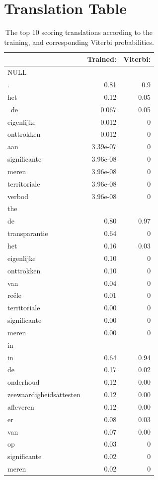 \documentclass[11pt]{article}
\begin{document}
\appendix
\section{Translation Table}
\begin{table}[h]
\begin{tabular}{l r r}

		&Trained:	&Viterbi:\\\hline\hline
NULL &&\\\hline
.		&0.81		&0.9\\
het		&0.12		&0.05\\\
de		&0.067	&0.05\\
eigenlijke	&0.012	&0\\
onttrokken	&0.012	&0\\
aan		&3.39e-07	&0\\
significante	&3.96e-08	&0\\
meren		&3.96e-08	&0\\
territoriale	&3.96e-08	&0\\
verbod	&3.96e-08	&0\\\hline\hline
%
the&&\\\hline		
de		&0.80		&0.97\\
transparantie &0.64	&0\\
het		&0.16		&0.03\\
eigenlijke	&0.10		&0\\
onttrokken	&0.10		&0\\
van		&0.04		&0\\
re\"ele	&0.01		&0\\
territoriale	&0.00		&0\\
significante	&0.00		&0\\
meren		&0.00		&0\\\hline\hline
%
in	&&\\\hline
in				&0.64	&0.94\\
de				&0.17	&0.02\\
onderhoud			&0.12	&0.00\\
zeewaardigheidsattesten	&0.12	&0.00\\
afleveren			&0.12	&0.00\\
er				&0.08	&0.03\\
van				&0.07	&0.00\\
op				&0.03	&0\\
significante			&0.02	&0\\
meren				&0.02	&0\\\hline\hline
\end{tabular}
\caption{The top 10 scoring translations according to the training, and corresponding Viterbi probabilities.}
\label{firstPart}
\end{table}
\end{document}
